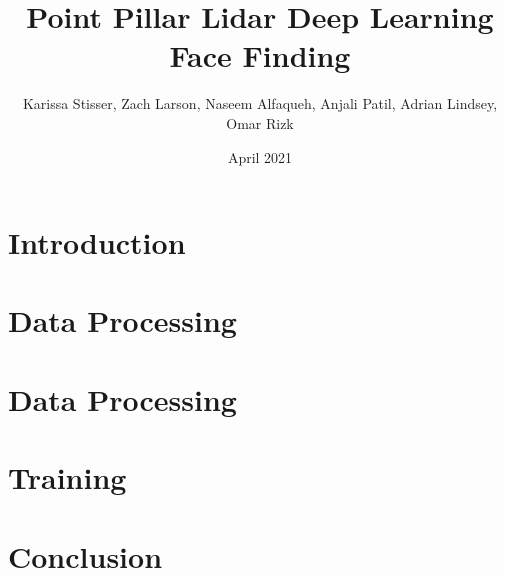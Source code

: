 \documentclass{article}
\title{Point Pillar Lidar Deep Learning Face Finding}
\author{Karissa Stisser, Zach Larson, Naseem Alfaqueh, Anjali Patil, Adrian Lindsey, Omar Rizk }
\date{April 2021}
\begin{document}
\maketitle

\section{Introduction}

\section{Data Processing}

\section{Data Processing}

\section{Training}

\section{Conclusion}
\end{document}
